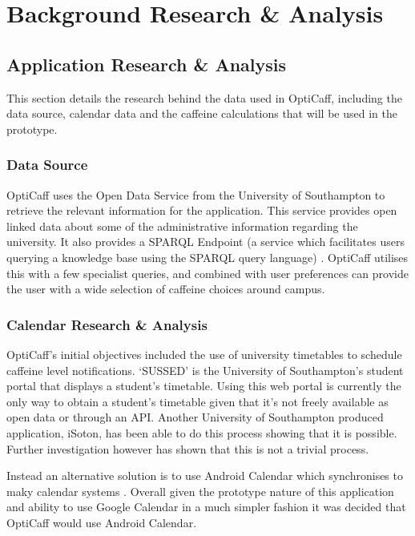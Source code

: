 \section{Background Research \& Analysis}

\subsection{Application Research \& Analysis}
This section details the research behind the data used in OptiCaff, including the data source, calendar data and the caffeine calculations that will be used in the prototype. 

\subsubsection{Data Source}
\label{sec:Data}
OptiCaff uses the Open Data Service from the University of Southampton \cite{DataSouthampton} to retrieve the relevant information for the application. This service provides open linked data about some of the administrative information regarding the university. It also provides a SPARQL Endpoint \cite{SotonSparql} (a service which facilitates users querying a knowledge base using the SPARQL query language) \cite{SparqlEndpoint}. OptiCaff utilises this with a few specialist queries, and combined with user preferences can provide the user with a wide selection of caffeine choices around campus. 

\subsubsection{Calendar Research \& Analysis}
\label{sec:calendar}
OptiCaff’s initial objectives included the use of university timetables to schedule caffeine level notifications. 
`SUSSED' is the University of Southampton's student portal that displays a student’s timetable. 
Using this web portal is currently the only way to obtain a student's timetable given that it's not freely available as open data or through an API. 
Another University of Southampton produced application, iSoton, has been able to do this process showing that it is possible.
Further investigation however has shown that this is not a trivial process. 

Instead an alternative solution is to use Android Calendar which synchronises to maky calendar systems \cite{calendar}.
Overall given the prototype nature of this application and ability to use Google Calendar in a much simpler fashion it was decided that OptiCaff would use Android Calendar. 

